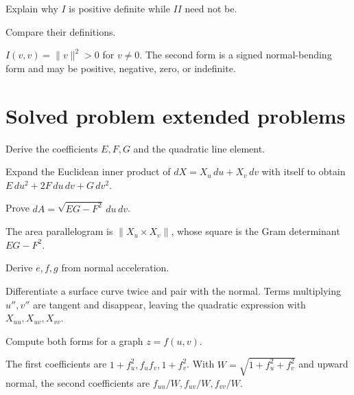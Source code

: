 \begin{exercise}\label{exr:vii15-24}
Explain why \(I\) is positive definite while \(II\) need not be.
\end{exercise}
\begin{hint}
Compare their definitions.
\end{hint}
\begin{solution}
\(I(v,v)=\|v\|^2>0\) for \(v\neq0\). The second form is a signed normal-bending form and may be positive, negative, zero, or indefinite.
\end{solution}

\section{Solved problem extended problems}
\begin{problem}\label{prob:vii15-01}
Derive the coefficients \(E,F,G\) and the quadratic line element.
\end{problem}
\begin{solution}
Expand the Euclidean inner product of \(dX=X_u\,du+X_v\,dv\) with itself to obtain \(E\,du^2+2F\,du\,dv+G\,dv^2\).
\end{solution}

\begin{problem}\label{prob:vii15-02}
Prove \(dA=\sqrt{EG-F^2}\,du\,dv\).
\end{problem}
\begin{solution}
The area parallelogram is \(\|X_u\times X_v\|\), whose square is the Gram determinant \(EG-F^2\).
\end{solution}

\begin{problem}\label{prob:vii15-03}
Derive \(e,f,g\) from normal acceleration.
\end{problem}
\begin{solution}
Differentiate a surface curve twice and pair with the normal. Terms multiplying \(u'',v''\) are tangent and disappear, leaving the quadratic expression with \(X_{uu},X_{uv},X_{vv}\).
\end{solution}

\begin{problem}\label{prob:vii15-04}
Compute both forms for a graph \(z=f(u,v)\).
\end{problem}
\begin{solution}
The first coefficients are \(1+f_u^2,f_uf_v,1+f_v^2\). With \(W=\sqrt{1+f_u^2+f_v^2}\) and upward normal, the second coefficients are \(f_{uu}/W,f_{uv}/W,f_{vv}/W\).
\end{solution}

